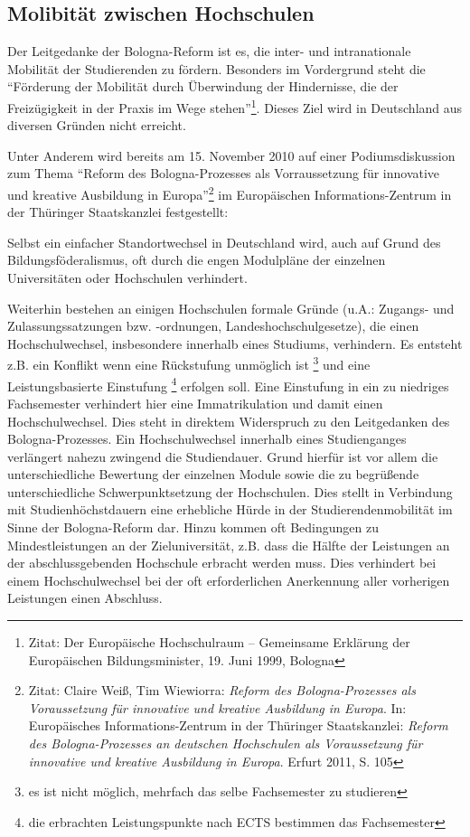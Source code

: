 
\subsection{Molibität zwischen Hochschulen}

Der Leitgedanke der Bologna-Reform ist es, die inter- und intranationale
Mobilität der Studierenden zu fördern. Besonders im Vordergrund steht die
"`Förderung der Mobilität durch Überwindung der Hindernisse, die der
Freizügigkeit in der Praxis im Wege stehen"'\footnote{Zitat: Der Europäische Hochschulraum – Gemeinsame Erklärung der Europäischen Bildungsminister, 19. Juni 1999, Bologna}.  Dieses Ziel wird in
Deutschland aus diversen Gründen nicht erreicht.

Unter Anderem wird bereits am 15. November 2010 auf einer
Podiumsdiskussion zum Thema "`Reform des Bologna-Prozesses als Vorraussetzung
für innovative und kreative Ausbildung in Europa"'\footnote{Zitat: Claire Weiß, Tim Wiewiorra: \textit{Reform des Bologna-Prozesses als Voraussetzung
  für innovative und kreative Ausbildung in Europa}. In: Europäisches
  Informations-Zentrum in der Thüringer Staatskanzlei:
  \textit{Reform des Bologna-Prozesses an deutschen Hochschulen als Voraussetzung für
  innovative und kreative Ausbildung in Europa}. Erfurt 2011, S. 105} im Europäischen
Informations-Zentrum in der Thüringer Staatskanzlei festgestellt:
\begin{displayquote}
 Selbst ein einfacher Standortwechsel in Deutschland wird, auch auf Grund des
 Bildungsföderalismus, oft durch die engen Modulpläne der einzelnen
 Universitäten oder Hochschulen verhindert.
\end{displayquote}
Weiterhin bestehen an einigen Hochschulen formale Gründe (u.A.: Zugangs- und
Zulassungssatzungen bzw. -ordnungen, Landeshochschulgesetze), die einen
Hochschulwechsel, insbesondere innerhalb eines Studiums, verhindern. Es entsteht
z.B. ein Konflikt wenn eine Rückstufung unmöglich ist \footnote{es ist nicht
möglich, mehrfach das selbe Fachsemester zu studieren} und eine
Leistungsbasierte Einstufung \footnote{die erbrachten Leistungspunkte nach ECTS
bestimmen das Fachsemester} erfolgen soll. Eine Einstufung in ein zu niedriges
Fachsemester verhindert hier eine Immatrikulation und damit einen
Hochschulwechsel. Dies steht in direktem Widerspruch zu den Leitgedanken des
Bologna-Prozesses.
Ein Hochschulwechsel innerhalb eines Studienganges verlängert nahezu zwingend
die Studiendauer. Grund hierfür ist vor allem die unterschiedliche Bewertung der
einzelnen Module sowie die zu begrüßende unterschiedliche Schwerpunktsetzung der
Hochschulen. Dies stellt in Verbindung mit Studienhöchstdauern eine erhebliche
Hürde in der Studierendenmobilität im Sinne der Bologna-Reform dar.
\newpage
Hinzu kommen oft Bedingungen zu Mindestleistungen an der Zieluniversität, z.B.
dass die Hälfte der Leistungen an der abschlussgebenden Hochschule erbracht
werden muss. Dies verhindert bei einem Hochschulwechsel bei der oft
erforderlichen Anerkennung aller vorherigen Leistungen einen Abschluss.

